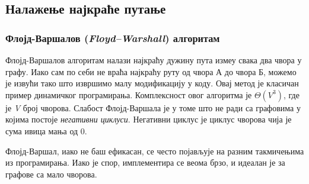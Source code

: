 \documentclass[11pt, oneside, a4paper]{article}
\begin{document}
\subsection{Налажење најкраће путање}
\subsubsection*{Флојд-Варшалов (\textit{Floyd–Warshall}) алгоритам}
Флојд-Варшалов алгоритам налази најкраћу дужину пута измеу свака два чвора у графу. Иако сам по себи не враћа најкраћу руту од чвора А до чвора Б, можемо је извући тако што извршимо малу модификацију у коду. Овај метод је класичан пример динамичког програмирања. Комплексност овог алгоритма је $\Theta(V^3)$, где је \textit{V} број чворова. Слабост Флојд-Варшала је у томе што не ради са графовима у којима постоје \textit{негативни циклуси}. Негативни циклус је циклус чворова чија је сума ивица мања од 0. \par
Флојд-Варшал, иако не баш ефикасан, се често појављује на разним такмичењима из програмирања. Иако је спор, имплементира се веома брзо, и идеалан је за графове са мало чворова.
\end{document}
